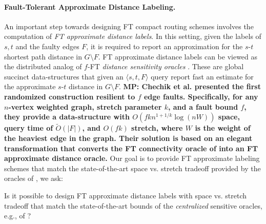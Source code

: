 \paragraph{Fault-Tolerant Approximate Distance Labeling.} An important step towards designing FT compact routing schemes involves the computation of \emph{FT approximate distance labels}. In this setting, given the labels of $s,t$ and the faulty edges $F$, it is required to report an approximation for the $s$-$t$ shortest path distance in $G \setminus F$.  FT approximate distance labels can be viewed as the distributed analog of $f$-FT \emph{distance sensitivity oracles} \cite{khanna2010approximate,WeimannY10}. 
These are global succinct data-structures that given an $\langle s,t,F \rangle$ query report fast an estimate for the approximate $s$-$t$ distance in $G \setminus F$. \textbf{MP: Chechik et al. \cite{chechik2012f} presented the first randomized construction resilient to $f$ edge faults. 
Specifically, for any $n$-vertex weighted graph, stretch parameter $k$, and a fault bound $f$, they provide a data-structure with $O(f k n^{1+1/k}\log(nW))$ space, query time of $\widetilde{O}(|F|)$, and $O(f k)$ stretch, where $W$ is the weight of the heaviest edge in the graph. Their solution is based on an elegant transformation that converts the FT connectivity oracle of \cite{patrascu2007planning} into an FT approximate distance oracle.} Our goal is to provide FT approximate labeling schemes that match the state-of-the-art space vs. stretch tradeoff provided by the oracles of \cite{chechik2012f}, we ask:

\begin{question}\label{q:dist-label}
Is it possible to design FT approximate distance labels with space vs. stretch tradeoff that match the state-of-the-art bounds of the \emph{centralized} sensitive oracles, e.g., of \cite{chechik2012f}?
\end{question}

